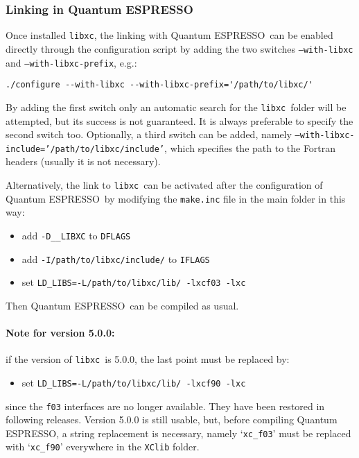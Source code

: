 \documentclass[12pt,a4paper]{article}
\def\qe{{\sc Quantum ESPRESSO}}
\def\libxc{\texttt{libxc}}
\begin{document}
\subsubsection{Linking in \qe}
Once installed \libxc, the linking with \qe\ can be enabled directly through the configuration script by adding the two switches \texttt{--with-libxc} and \texttt{--with-libxc-prefix}, e.g.:
\begin{verbatim}
./configure --with-libxc --with-libxc-prefix='/path/to/libxc/'
\end{verbatim}
By adding the first switch only an automatic search for the \libxc\ folder will be attempted, but its success is not guaranteed. It is always preferable to specify the second switch too. Optionally, a third switch can be added, namely \texttt{--with-libxc-include='/path/to/libxc/include'}, which specifies the path to the Fortran headers (usually it is not necessary).

Alternatively, the link to \libxc\ can be activated after the configuration of  \qe\ by modifying the \texttt{make.inc} file in the main folder in this way:
\begin{itemize}
	\item add \texttt{-D\_\_LIBXC} to \texttt{DFLAGS}
	\item add \texttt{-I/path/to/libxc/include/} to \texttt{IFLAGS}
	\item set \texttt{LD\_LIBS=-L/path/to/libxc/lib/ -lxcf03 -lxc}
\end{itemize}
Then \qe\ can be compiled as usual.

\paragraph{Note for version 5.0.0:} if the version of \libxc\ is 5.0.0, the last point must be replaced by:
\begin{itemize}
	\item set \texttt{LD\_LIBS=-L/path/to/libxc/lib/ -lxcf90 -lxc}
\end{itemize}
since the \texttt{f03} interfaces are no longer available. They have been restored in following releases. Version 5.0.0 is still usable, but, before compiling \qe, a string replacement is necessary, namely `\texttt{xc\_f03}' must be replaced with `\texttt{xc\_f90}' everywhere in the \texttt{XClib} folder.
\end{document}
